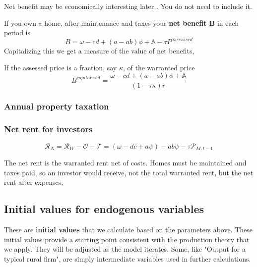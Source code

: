 {\color{red}
Net benefit may be economically interesting later . You do not need to include it. 

If you own a home, after maintenance and taxes your \textbf{net benefit B} in each period is 
\[B= \omega-cd +(a-ab)\phi +\mathbb{A} - \tau P^{assesssed}\]
Capitalizing this we get a measure of the value of net benefits, 

If the assessed price is a fraction, say $\kappa$,  of the warranted price
\[B^{capitalized}=\frac{\omega-cd +(a-ab)\phi + \mathbb{A}}{(1- \tau\kappa)r}\]
}
\subsubsection{Annual property taxation}






\subsubsection{Net rent for investors} {\color{green}}
\[\mathcal{R}_N = \mathcal{R}_W - \mathcal{O} - \mathcal{T}= (\omega - {dc} + a\psi )- a b \psi - \tau  \mathcal{P}_{M, t-1}\]

The \gls{net rent} is the warranted rent net of costs. Homes must be maintained and taxes paid, so an investor would receive, not the total warranted rent, but the net rent after expenses,



\subsection{Initial values for endogenous variables} \label{sec-init-value-list}

These are \textbf{initial values} that we calculate based on the parameters above. These initial values provide  a starting point consistent with the production theory that we apply. They will be adjusted as the model iterates.  Some, like "Output for a typical rural firm", are simply intermediate variables used in further calculations.%




